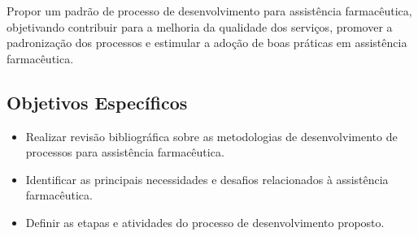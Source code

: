 Propor um padrão de processo de desenvolvimento para assistência farmacêutica, objetivando contribuir para a melhoria da qualidade dos serviços, promover a padronização dos processos e estimular a adoção de boas práticas em assistência farmacêutica.

\subsection{Objetivos Específicos}\label{subsec:objetivos-especificos}
\begin{itemize}

    \item Realizar revisão bibliográfica sobre as metodologias de desenvolvimento de processos para assistência farmacêutica.
    \item Identificar as principais necessidades e desafios relacionados à assistência farmacêutica.
    \item Definir as etapas e atividades do processo de desenvolvimento proposto.

\end{itemize}
